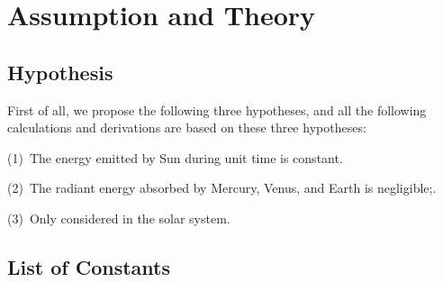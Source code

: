 \documentclass[../Paper.tex]{subfiles}
\begin{document}
\section{Assumption and Theory}

\subsection{Hypothesis}

First of all, we propose the following three hypotheses, and all the following calculations and derivations are based on these three hypotheses:

(1)~The energy emitted by Sun during unit time is constant. 

(2)~The radiant energy absorbed by Mercury, Venus, and Earth is negligible;.

(3)~Only considered in the solar system. 

\subsection{List of Constants}
\end{document}
